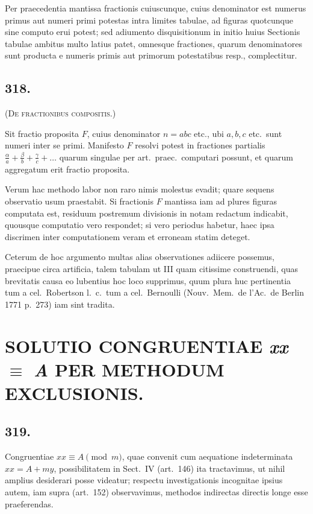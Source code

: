 \documentclass[12pt,a4paper]{article}
\theoremstyle{plain}
\theoremstyle{definition}
\theoremstyle{remark}
\begin{document}
Per praecedentia mantissa fractionis cuiuscunque, cuius denominator est
numerus primus aut numeri primi potestas intra limites tabulae, ad figuras
quotcunque sine computo erui potest; sed adiumento disquisitionum in initio
huius Sectionis tabulae ambitus multo latius patet, omnesque fractiones, quarum
denominatores sunt producta e numeris primis aut primorum potestatibus
resp., complectitur.

\subsection*{318.}

\textsc{(De fractionibus compositis.)}

Sit fractio proposita $F$, cuius denominator $n = abc$ etc., ubi $a, b, c$ etc.\ sunt
numeri inter se primi. Manifesto $F$ resolvi potest in fractiones partialis
$\tfrac{\alpha}{a} + \tfrac{\beta}{b} + \tfrac{\gamma}{c} + \ldots$ quarum singulae per art.\ praec.\ computari possunt,
et quarum aggregatum erit fractio proposita.

Verum hac methodo labor non raro nimis molestus evadit; quare sequens
observatio usum praestabit. Si fractionis $F$ mantissa iam ad plures figuras
computata est, residuum postremum divisionis in notam redactum indicabit,
quousque computatio vero respondet; si vero periodus habetur, haec ipsa
discrimen inter computationem veram et erroneam statim deteget.

Ceterum de hoc argumento multas alias observationes adiicere possemus,
praecipue circa artificia, talem tabulam ut III quam citissime construendi, quas
brevitatis causa eo lubentius hoc loco supprimus, quum plura huc pertinentia
tum a cel.\ Robertson l.\ c.\ tum a cel.\ Bernoulli (Nouv.\ Mem.\ de l'Ac.\ de
Berlin 1771 p.\@~273) iam sint tradita.

\newpage
{}
\section*{SOLUTIO CONGRUENTIAE \emph{xx} $\equiv$ \emph{A} PER METHODUM EXCLUSIONIS.}


\subsection*{319.}

Congruentiae $xx \equiv A \pmod{m}$, quae convenit cum aequatione indeterminata
$xx = A + my$, possibilitatem in Sect.\ IV (art.\@~146) ita tractavimus, ut nihil
amplius desiderari posse videatur; respectu investigationis incognitae ipsius
autem, iam supra (art.\@~152) observavimus, methodos indirectas directis longe
esse praeferendas.
\end{document}

